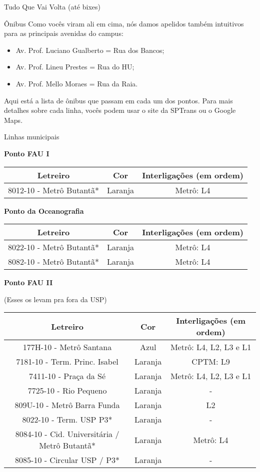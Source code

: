 \begin{secao}{Tudo Que Vai Volta (até bixes)}
\begin{subsecao}{Ônibus}
Como vocês viram ali em cima, nós damos apelidos também intuitivos para as
principais avenidas do campus:
\begin{itemize}
	\item Av. Prof. Luciano Gualberto = Rua dos Bancos;
	\item Av. Prof. Lineu Prestes = Rua do HU;
	\item Av. Prof. Mello Moraes = Rua da Raia.
\end{itemize}

Aqui está a lista de ônibus que passam em cada um dos pontos. Para mais detalhes
sobre cada linha, vocês podem usar o site da SPTrans ou o Google Maps.

\begin{subsubsecao}{Linhas municipais}

{\bf Ponto FAU I}

\begin{center}
	\begin{tabular}{|c|c|c|}
      \hline
	  Letreiro & Cor & Interligações (em ordem)\\
	  \hline
	  8012-10 - Metrô Butantã* & Laranja & Metrô: L4\\
      \hline
	\end{tabular}
\end{center}

{\bf Ponto da Oceanografia}

\begin{center}
	\begin{tabular}{|c|c|c|}
      \hline
	  Letreiro & Cor & Interligações (em ordem)\\
	  \hline
	  8022-10 - Metrô Butantã* & Laranja & Metrô: L4\\
   	  8082-10 - Metrô Butantã* & Laranja & Metrô: L4\\
      \hline
	\end{tabular}
\end{center}

{\bf Ponto FAU II}

(Esses os levam pra fora da USP)
\begin{center}
	\begin{tabular}{|c|c|c|}
      \hline
	  Letreiro & Cor & Interligações (em ordem)\\
	  \hline
	  177H-10 - Metrô Santana & Azul & Metrô: L4, L2, L3 e L1\\
	  7181-10 - Term. Princ. Isabel & Laranja & CPTM: L9\\
	  7411-10 - Praça da Sé & Laranja & Metrô: L4, L2, L3 e L1\\
	  7725-10 - Rio Pequeno & Laranja & - \\
	  809U-10 - Metrô Barra Funda & Laranja & L2 \\
	  8022-10 - Term. USP P3* & Laranja & -\\
   	  8084-10 - Cid. Universitária / Metrô Butantã* & Laranja & Metrô: L4\\
      	  8085-10 - Circular USP / P3* & Laranja & -\\
      \hline
	\end{tabular}
\end{center}


\end{subsubsecao}
\end{subsecao}
\end{secao}
